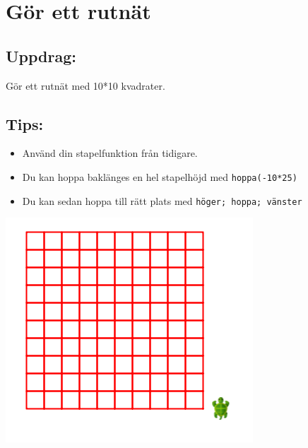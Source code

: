 \chapter{Gör ett rutnät}
\begin{multicols}{2}
\section*{\color{BrickRed}Uppdrag:}
Gör ett rutnät med 10*10 kvadrater.
\section*{\color{OliveGreen}Tips:}


\begin{itemize}

\item {Använd din stapelfunktion från tidigare.}
\item {Du kan hoppa baklänges en hel stapelhöjd med \lstinline{hoppa(-10*25)}}
\item {Du kan sedan hoppa till rätt plats med \lstinline{höger; hoppa; vänster}}

\end{itemize}



\columnbreak

\begin{center}
\includegraphics{../img/square-grid.png}
\end{center}

\end{multicols}

